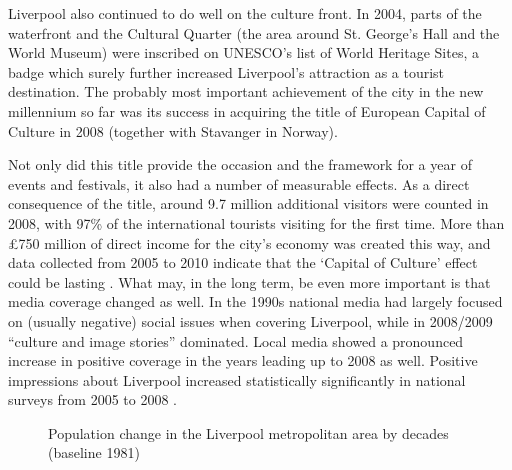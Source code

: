 Liverpool also continued to do well on the culture front.
In 2004, parts of the waterfront and the Cultural Quarter (the area around St. George's Hall and the World Museum) were inscribed on UNESCO's list of World Heritage Sites, a badge which surely further increased Liverpool's attraction as a tourist destination.
The probably most important achievement of the city in the new millennium so far was its success in acquiring the title of European Capital of Culture in 2008 (together with Stavanger in Norway).

Not only did this title provide the occasion and the framework for a year of events and festivals, it also had a number of measurable effects.
As a direct consequence of the title, around 9.7 million additional visitors were counted in 2008, with 97\% of the international tourists visiting for the first time.
More than £750 million of direct income for the city's economy was created this way, and data collected from 2005 to 2010 indicate that the `Capital of Culture' effect could be lasting \parencite{garciaetal2010}.
What may, in the long term, be even more important is that media coverage changed as well.
In the 1990s national media had largely focused on (usually negative) social issues when covering Liverpool, while in 2008/2009 ``culture and image stories'' dominated.
Local media showed a pronounced increase in positive coverage in the years leading up to 2008 as well.
Positive impressions about Liverpool increased statistically significantly in national surveys from 2005 to 2008 \citep[cf.][25 and 44--46]{garciaetal2010}.

	\begin{figure}[h]
		\centering
		
		\caption[Population change in the Liverpool area]{Population change in the Liverpool metropolitan area by decades (baseline 1981)}
		\label{fig.population}
	\end{figure}

